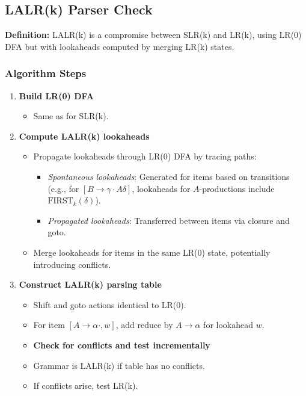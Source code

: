 \subsection{LALR(k) Parser Check}

\textbf{Definition:} LALR(k) is a compromise between SLR(k) and LR(k), using LR(0) DFA but with lookaheads computed by merging LR(k) states.

\subsubsection{Algorithm Steps}

\begin{enumerate}
    \item \textbf{Build LR(0) DFA}
    \begin{itemize}
        \item Same as for SLR(k).
    \end{itemize}

    \item \textbf{Compute LALR(k) lookaheads}
    \begin{itemize}
        \item Propagate lookaheads through LR(0) DFA by tracing paths:
        \begin{itemize}
            \item \emph{Spontaneous lookaheads}: Generated for items based on transitions (e.g., for \( [B \to \gamma \cdot A \delta] \), lookaheads for \( A \)-productions include \(\text{FIRST}_k(\delta)\)).
            \item \emph{Propagated lookaheads}: Transferred between items via closure and goto.
        \end{itemize}
        \item Merge lookaheads for items in the same LR(0) state, potentially introducing conflicts.
    \end{itemize}

    \item \textbf{Construct LALR(k) parsing table}
    \begin{itemize}
        \item Shift and goto actions identical to LR(0).
        \item For item \( [A \to \alpha \cdot, w] \), add reduce by \( A \to \alpha \) for lookahead \( w \).
    \end{itemize}
    \begin{itemize}
    \item \textbf{Check for conflicts and test incrementally}
    \item Grammar is LALR(k) if table has no conflicts.
    \item If conflicts arise, test LR(k).
    \end{itemize}
\end{enumerate}

